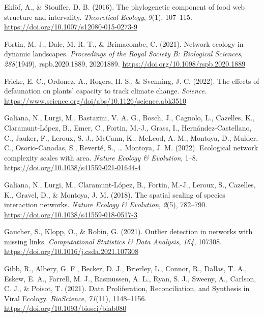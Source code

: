 \documentclass[11pt]{article}
\newlength{\cslhangindent}
\newenvironment{CSLReferences}[2] %
 {%
  \setlength{\parindent}{0pt}
  \ifodd #1 \everypar{\setlength{\hangindent}{\cslhangindent}}\ignorespaces\fi
  \ifnum #2 > 0
  \setlength{\parskip}{#2\baselineskip}
  \fi
 }%
 {}
\begin{document}
\begin{CSLReferences}{1}{0}
\leavevmode{}%
Eklöf, A., \& Stouffer, D. B. (2016). The phylogenetic component of food
web structure and intervality. \emph{Theoretical Ecology}, \emph{9}(1),
107--115. \url{https://doi.org/10.1007/s12080-015-0273-9}

\leavevmode{}%
Fortin, M.-J., Dale, M. R. T., \& Brimacombe, C. (2021). Network ecology
in dynamic landscapes. \emph{Proceedings of the Royal Society B:
Biological Sciences}, \emph{288}(1949), rspb.2020.1889, 20201889.
\url{https://doi.org/10.1098/rspb.2020.1889}

\leavevmode{}%
Fricke, E. C., Ordonez, A., Rogers, H. S., \& Svenning, J.-C. (2022).
The effects of defaunation on plants' capacity to track climate change.
\emph{Science}.
\url{https://www.science.org/doi/abs/10.1126/science.abk3510}

\leavevmode{}%
Galiana, N., Lurgi, M., Bastazini, V. A. G., Bosch, J., Cagnolo, L.,
Cazelles, K., Claramunt-López, B., Emer, C., Fortin, M.-J., Grass, I.,
Hernández-Castellano, C., Jauker, F., Leroux, S. J., McCann, K., McLeod,
A. M., Montoya, D., Mulder, C., Osorio-Canadas, S., Reverté, S.,
\ldots{} Montoya, J. M. (2022). Ecological network complexity scales
with area. \emph{Nature Ecology \& Evolution}, 1--8.
\url{https://doi.org/10.1038/s41559-021-01644-4}

\leavevmode{}%
Galiana, N., Lurgi, M., Claramunt-López, B., Fortin, M.-J., Leroux, S.,
Cazelles, K., Gravel, D., \& Montoya, J. M. (2018). The spatial scaling
of species interaction networks. \emph{Nature Ecology \& Evolution},
\emph{2}(5), 782--790. \url{https://doi.org/10.1038/s41559-018-0517-3}

\leavevmode{}%
Gaucher, S., Klopp, O., \& Robin, G. (2021). Outlier detection in
networks with missing links. \emph{Computational Statistics \& Data
Analysis}, \emph{164}, 107308.
\url{https://doi.org/10.1016/j.csda.2021.107308}

\leavevmode{}%
Gibb, R., Albery, G. F., Becker, D. J., Brierley, L., Connor, R.,
Dallas, T. A., Eskew, E. A., Farrell, M. J., Rasmussen, A. L., Ryan, S.
J., Sweeny, A., Carlson, C. J., \& Poisot, T. (2021). Data
Proliferation, Reconciliation, and Synthesis in Viral Ecology.
\emph{BioScience}, \emph{71}(11), 1148--1156.
\url{https://doi.org/10.1093/biosci/biab080}


\end{CSLReferences}
\end{document}
